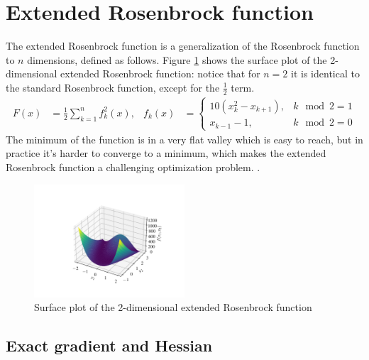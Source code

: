 \section{Extended Rosenbrock function}
\label{sec:extended_rosenbrock_results}

The extended Rosenbrock function is a generalization of the Rosenbrock function to $n$ dimensions, defined as follows.
Figure \ref{fig:extended_rosenbrock_surf} shows the surface plot of the 2-dimensional extended Rosenbrock function: notice that for $n=2$ it is identical to the standard Rosenbrock function, except for the $\frac12$ term.
\begin{align}
\label{eq:extended_rosenbrock}
F(x) &= \frac12 \sum_{k=1}^n f_k^2(x), &
f_k(x) &= \left \{ \begin{array}{ll}
10(x_k^2 - x_{k+1}), & k\mod 2 = 1\\
x_{k-1} -1, & k\mod 2 = 0
\end{array} \right .
\end{align}
The minimum of the function is in a very flat valley which is easy to reach, but in practice it's harder to converge to a minimum, which makes the extended Rosenbrock function a challenging optimization problem.
.

\begin{figure}
    \centering
    \includegraphics[width=0.5\textwidth]{figures/extended_rosenbrock_surf.pdf}
    \caption{Surface plot of the 2-dimensional extended Rosenbrock function}
    \label{fig:extended_rosenbrock_surf}
\end{figure}

\subsection{Exact gradient and Hessian}
\label{subsec:extended_rosenbrock_exact}

